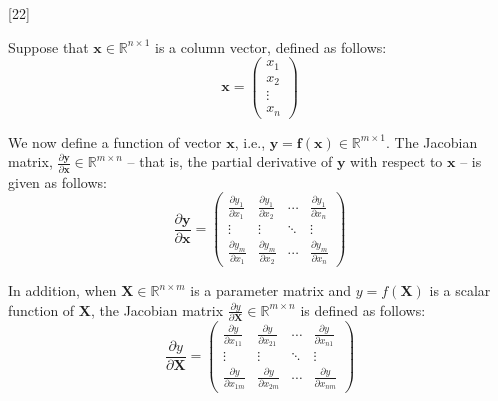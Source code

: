 [22]

Suppose that ${\mathbf{x}} \in {\mathbb{R}}^{n \times 1}$ is a column vector, defined as follows:
\begin{equation}    
\mathbf{x} = \begin{pmatrix}
x_1 \\
x_2 \\
\vdots \\
x_n
\end{pmatrix}
\end{equation}

We now define a function of vector ${\mathbf{x}}$, i.e., ${\mathbf{y}} = {\mathbf{f}}\left({\mathbf{x}}\right) \in {\mathbb{R}}^{m \times 1}$.
The Jacobian matrix, $\frac{ \partial {\mathbf{y}} }{\partial {\mathbf{x}} } \in {\mathbb{R}}^{m \times n}$ -- that is, the partial derivative of ${\mathbf{y}}$ with respect to ${\mathbf{x}}$ -- is given as follows:
\begin{equation}
   \frac{\partial \mathbf{y}}{\partial \mathbf{x}} = 
\begin{pmatrix}
\frac{\partial y_1}{\partial x_1} & \frac{\partial y_1}{\partial x_2} & \cdots & \frac{\partial y_1}{\partial x_n} \\
\vdots & \vdots & \ddots & \vdots \\
\frac{\partial y_m}{\partial x_1} & \frac{\partial y_m}{\partial x_2} & \cdots & \frac{\partial y_m}{\partial x_n}
\end{pmatrix}
\end{equation}

In addition, when ${\mathbf{X}} \in {\mathbb{R}}^{n \times m}$ is a parameter matrix and $y = f({\mathbf{X}})$ is a scalar function of ${\mathbf{X}}$, the Jacobian matrix $\frac{ \partial y }{\partial {\mathbf{X}} } \in {\mathbb{R}}^{m \times n}$ is defined as follows:
\begin{equation}
\frac{\partial y}{\partial \mathbf{X}} =
\begin{pmatrix}
\frac{\partial y}{\partial x_{11}} & \frac{\partial y}{\partial x_{21}} & \cdots & \frac{\partial y}{\partial x_{n1}} \\
\vdots & \vdots & \ddots & \vdots \\
\frac{\partial y}{\partial x_{1m}} & \frac{\partial y}{\partial x_{2m}} & \cdots & \frac{\partial y}{\partial x_{nm}}
\end{pmatrix}
\end{equation}

